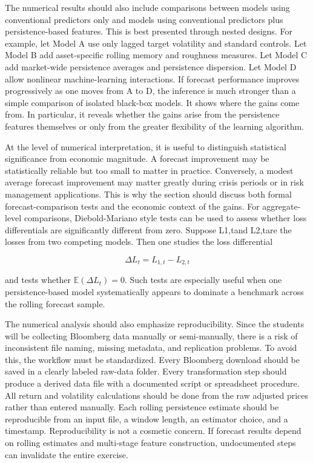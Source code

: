 \documentclass[12pt]{article}
\begin{document}
The numerical results should also include comparisons between models using conventional predictors only and models using conventional predictors plus persistence-based features. This is best presented through nested designs. For example, let Model A use only lagged target volatility and standard controls. Let Model B add asset-specific rolling memory and roughness measures. Let Model C add market-wide persistence averages and persistence dispersion. Let Model D allow nonlinear machine-learning interactions. If forecast performance improves progressively as one moves from A to D, the inference is much stronger than a simple comparison of isolated black-box models. It shows where the gains come from. In particular, it reveals whether the gains arise from the persistence features themselves or only from the greater flexibility of the learning algorithm.

At the level of numerical interpretation, it is useful to distinguish statistical significance from economic magnitude. A forecast improvement may be statistically reliable but too small to matter in practice. Conversely, a modest average forecast improvement may matter greatly during crisis periods or in risk management applications. This is why the section should discuss both formal forecast-comparison tests and the economic context of the gains. For aggregate-level comparisons, Diebold-Mariano style tests can be used to assess whether loss differentials are significantly different from zero. Suppose L1,tand L2,tare the losses from two competing models. Then one studies the loss differential

\[\Delta L_t = L_{1,t} - L_{2,t}\]

and tests whether $\mathbb{E}(\Delta L_t)=0$. Such tests are especially useful when one persistence-based model systematically appears to dominate a benchmark across the rolling forecast sample.

The numerical analysis should also emphasize reproducibility. Since the students will be collecting Bloomberg data manually or semi-manually, there is a risk of inconsistent file naming, missing metadata, and replication problems. To avoid this, the workflow must be standardized. Every Bloomberg download should be saved in a clearly labeled raw-data folder. Every transformation step should produce a derived data file with a documented script or spreadsheet procedure. All return and volatility calculations should be done from the raw adjusted prices rather than entered manually. Each rolling persistence estimate should be reproducible from an input file, a window length, an estimator choice, and a timestamp. Reproducibility is not a cosmetic concern. If forecast results depend on rolling estimates and multi-stage feature construction, undocumented steps can invalidate the entire exercise.
\end{document}
